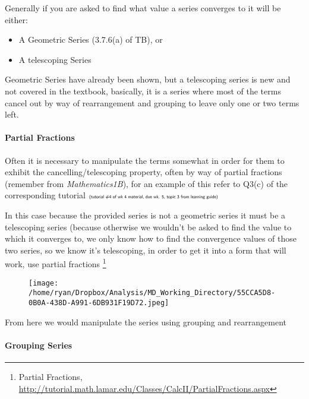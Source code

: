 \documentclass[
]{article}
\let\oldparagraph\paragraph
\renewcommand{\paragraph}[1]{\oldparagraph{#1}\mbox{}}
\begin{document}
Generally if you are asked to find what value a series converges to it
will be either:

\begin{itemize}
\item
  A Geometric Series (3.7.6(a) of TB), or
\item
  A telescoping Series
\end{itemize}

Geometric Series have already been shown, but a telescoping series is
new and not covered in the textbook, basically, it is a series where
most of the terms cancel out by way of rearrangement and grouping to
leave only one or two terms left.



\hypertarget{header-n3218}{%
\paragraph{Partial Fractions}\label{header-n3218}}

Often it is necessary to manipulate the terms somewhat in order for them
to exhibit the cancelling/telescoping property, often by way of partial
fractions (remember from \emph{Mathematics1B}), for an example of this
refer to Q3(c) of the corresponding tutorial
\(\tiny \textsf{(tutorial \#4 of wk 4 material, due wk. 5, topic 3 from learning guide)}\)

In this case because the provided series is not a geometric series it
must be a telescoping series (because otherwise we wouldn't be asked to
find the value to which it converges to, we only know how to find the
convergence values of those two series, so we know it's telescoping, in
order to get it into a form that will work, use partial fractions
\footnote{Partial Fractions,
  \href{Pauls\%20Calculus}{http://tutorial.math.lamar.edu/Classes/CalcII/PartialFractions.aspx}}

\begin{figure}
\centering
\texttt{[image: /home/ryan/Dropbox/Analysis/MD\_Working\_Directory/55CCA5D8-0B0A-438D-A991-6DB931F19D72.jpeg]}
\caption{}
\end{figure}

From here we would manipulate the series using grouping and
rearrangement

\hypertarget{header-n3223}{%
\paragraph{Grouping Series}\label{header-n3223}}
\end{document}
